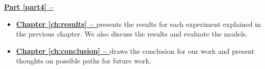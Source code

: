 \vspace{0.5cm}\noindent
\begin{minipage}{\linewidth}
    \textbf{{\hyperref[part4]{Part \ref{part4} -- }}}
    \begin{itemize}
        \item\textbf{\hyperref[ch:results]{Chapter \ref{ch:results} -- }} presents the results for each experiment explained in the previous chapter. We also discuss the results and evaluate the models.
        \item\textbf{\hyperref[ch:conclusion]{Chapter \ref{ch:conclusion} -- }} draws the conclusion for our work and present thoughts on possible paths for future work.
    \end{itemize}
\end{minipage}